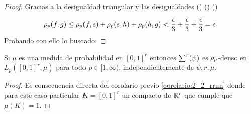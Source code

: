 \begin{proof}
    Gracias a la desigualdad triangular y las desigualdades
    ()
    ()
    ()

    \begin{equation}
        \rho_{p}(f,g) 
        \leq
            \rho_{p}(f,s)
            +\rho_{p}(s,h)
            + \rho_{p}(h,g)
        < 
        \frac{\epsilon}{3} + \frac{\epsilon}{3} + \frac{\epsilon}{3}
        = \epsilon.
    \end{equation}
Probando con ello lo buscado. 
\end{proof}  

\begin{corolario}
    Si $\mu$ es una medida de probabilidad en $[0,1]^r$
    entonces 
    $\sum^r (\psi)$ es $\rho_{p}$-denso en 
    $L_p([0,1]^r, \mu)$ para todo $p \in [1, \infty)$,
    independientemente de $\psi, r, \mu$. 
\end{corolario}
\begin{proof}
    Es consecuencia directa del corolario previo \ref{corolario:2_2_rrnn}
    donde para este caso particular $K = [0,1]^r$ un compacto
    de $\mathbb{R}^r$
    que cumple que $\mu(K) = 1.$
\end{proof}
